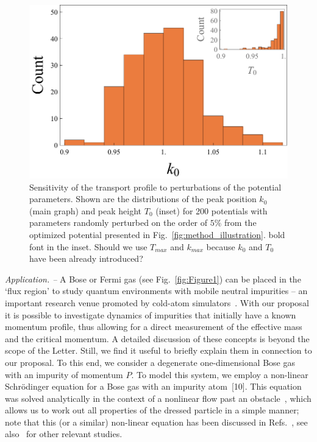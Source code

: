 \documentclass[twocolumn,amsmath,amssymb,showpacs,prl,superscriptaddress,aps]{revtex4-1}
\begin{document}
\begin{figure}
   \includegraphics[width=1\linewidth]{figures/plot_sensitivity.pdf}
 \caption[Sensitivity Plot]{Sensitivity of the transport profile to perturbations of the potential parameters. Shown are the distributions of the peak position $k_0$ (main graph) and peak height $T_0$ (inset) for 200 potentials with parameters randomly perturbed on the order of $5\%$ from the optimized potential presented in Fig.~\ref{fig:method_illustration}. {\color{red} bold font in the inset. Should we use $T_{max}$ and $k_{max}$ because $k_0$ and $T_0$ have been already introduced?} }
 \label{fig:sensitivity}
\end{figure}



{\it Application. --} A Bose or Fermi gas (see Fig.~\ref{fig:Figure1}) can be placed in the `flux region'
to study quantum environments with mobile neutral impurities -- an important research venue promoted by cold-atom 
simulators~\cite{zwierlein2009,salomon2009,grimm2012, widera2012, catani2012, fukuhara2013, hu2016,arlt2016,zaccanti2017}.
With our proposal it is possible to investigate dynamics of impurities that initially have 
a known momentum profile, thus allowing for a direct measurement of the effective mass and 
the critical momentum. A detailed discussion of these concepts is beyond the scope 
of the Letter. Still, we find it useful to briefly explain them in connection to our proposal. 
To this end, we consider a degenerate one-dimensional Bose gas with an impurity of momentum $P$.
To model this system, we employ a non-linear Schr{\"o}dinger equation
for a Bose gas with an impurity atom~[10]. This equation was solved analytically
in the context of a nonlinear flow past an obstacle~\cite{hakim1997}, 
which allows us to work out all properties of the dressed particle in a simple manner; 
note that this (or a similar) non-linear equation has been discussed in Refs.~\cite{kamenev2016, volosniev2017, mistakidis2018, dehkharghani2018, pastukhov2018},
see also~\cite{sacha2006, catani2012, kain2016, parisi2017,grusdt2017, pastukhov2017, kain2018} for other relevant studies. 
\end{document}
